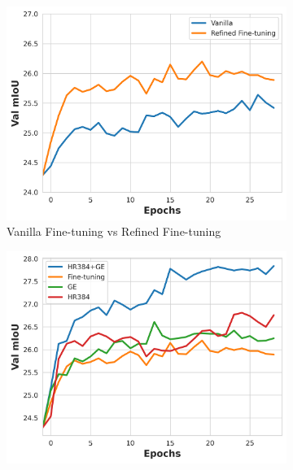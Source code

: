 \begin{figure}[t]
\centering


\begin{subfigure}{0.48\textwidth}
    \centering
    \includegraphics[width=\linewidth]{figures/experiments/baselineplots/ft1baseline.png}
    \caption{Vanilla Fine-tuning vs Refined Fine-tuning}
\label{fig:ftvsftre}
\end{subfigure}
\hfill
\begin{subfigure}{0.48\textwidth}
    \centering
    \includegraphics[width=\linewidth]{figures/experiments/baselineplots/prevbaseline.png}

\end{subfigure}
\end{figure}
